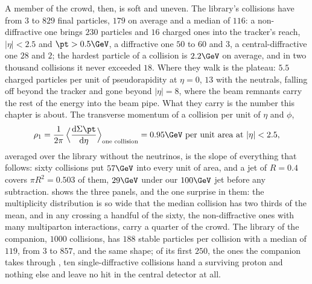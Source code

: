 A member of the crowd, then, is soft and uneven. The library's
collisions have from $3$ to $829$ final particles, $179$ on average and a
median of $116$: a non-diffractive one brings $230$ particles and $16$
charged ones into the tracker's reach, $|\eta|<2.5$ and $\pt>0.5\GeV$, a
diffractive one $50$ to $60$ and $3$, a central-diffractive one $28$ and
$2$; the hardest particle of a collision is $2.2\GeV$ on average, and in
two thousand collisions it never exceeded $18$. Where they walk is the
plateau: $5.5$ charged particles per unit of pseudorapidity at $\eta=0$,
$13$ with the neutrals, falling off beyond the tracker and gone beyond
$|\eta|=8$, where the beam remnants carry the rest of the energy into the
beam pipe. What they carry is the number this chapter is about. The
transverse momentum of a collision per unit of $\eta$ and $\phi$,
\begin{equation}
  \rhoPU_1=\frac{1}{2\pi}\,\Big\langle\frac{\mathrm{d}\Sigma\pt}{\mathrm{d}\eta}\Big\rangle_{\text{one collision}}
  =0.95\GeV\ \text{per unit area at }|\eta|<2.5,
  \label{eq:crowd_on_the_road:rho1}
\end{equation}
averaged over the library without the neutrinos, is the slope of
everything that follows: sixty collisions put $57\GeV$ into every unit of
area, and a jet of $R=0.4$ covers $\pi R^2=0.503$ of them, $29\GeV$
under our $100\GeV$ jet before any subtraction.
 shows the three panels, and
the one surprise in them: the multiplicity distribution is so wide that
the median collision has two thirds of the mean, and in any crossing a
handful of the sixty, the non-diffractive ones with many multiparton
interactions, carry a quarter of the crowd. The \CMSSW library of the
companion, $1000$ collisions, has $188$ stable particles per collision
with a median of $119$, from $3$ to $857$, and the same shape; of its
first $250$, the ones the companion takes through \GEANT, ten
single-diffractive collisions hand \GEANT a surviving proton and nothing
else and leave no hit in the central detector at all.

